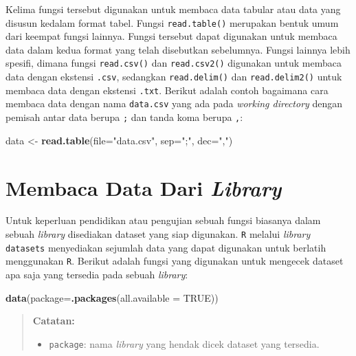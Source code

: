 \documentclass[
]{book}
\newenvironment{Shaded}{\begin{snugshade}}{\end{snugshade}}
\newcommand{\AttributeTok}[1]{\textcolor[rgb]{0.13,0.29,0.53}{#1}}
\newcommand{\ConstantTok}[1]{\textcolor[rgb]{0.56,0.35,0.01}{#1}}
\newcommand{\FunctionTok}[1]{\textcolor[rgb]{0.13,0.29,0.53}{\textbf{#1}}}
\newcommand{\NormalTok}[1]{#1}
\newcommand{\OtherTok}[1]{\textcolor[rgb]{0.56,0.35,0.01}{#1}}
\newcommand{\StringTok}[1]{\textcolor[rgb]{0.31,0.60,0.02}{#1}}
\providecommand{\tightlist}{%
  \setlength{\itemsep}{0pt}\setlength{\parskip}{0pt}}
\theoremstyle{definition}
\theoremstyle{definition}
\theoremstyle{definition}
\theoremstyle{definition}
\theoremstyle{remark}
\begin{document}
Kelima fungsi tersebut digunakan untuk membaca data tabular atau data yang disusun kedalam format tabel. Fungsi \texttt{read.table()} merupakan bentuk umum dari keempat fungsi lainnya. Fungsi tersebut dapat digunakan untuk membaca data dalam kedua format yang telah disebutkan sebelumnya. Fungsi lainnya lebih spesifi, dimana fungsi \texttt{read.csv()} dan \texttt{read.csv2()} digunakan untuk membaca data dengan ekstensi \texttt{.csv}, sedangkan \texttt{read.delim()} dan \texttt{read.delim2()} untuk membaca data dengan ekstensi \texttt{.txt}. Berikut adalah contoh bagaimana cara membaca data dengan nama \texttt{data.csv} yang ada pada \emph{working directory} dengan pemisah antar data berupa \texttt{;} dan tanda koma berupa \texttt{,}:

\begin{Shaded}
\begin{Highlighting}[]
\NormalTok{data }\OtherTok{\textless{}{-}} \FunctionTok{read.table}\NormalTok{(}\AttributeTok{file=}\StringTok{"data.csv"}\NormalTok{, }\AttributeTok{sep=}\StringTok{";"}\NormalTok{, }\AttributeTok{dec=}\StringTok{","}\NormalTok{)}
\end{Highlighting}
\end{Shaded}

\hypertarget{librarydata}{%
\section{\texorpdfstring{Membaca Data Dari \emph{Library}}{Membaca Data Dari Library}}\label{librarydata}}

Untuk keperluan pendidikan atau pengujian sebuah fungsi biasanya dalam sebuah \emph{library} disediakan dataset yang siap digunakan. \texttt{R} melalui \emph{library} \texttt{datasets} menyediakan sejumlah data yang dapat digunakan untuk berlatih menggunakan \texttt{R}. Berikut adalah fungsi yang digunakan untuk mengecek dataset apa saja yang tersedia pada sebuah \emph{library}:

\begin{Shaded}
\begin{Highlighting}[]
\FunctionTok{data}\NormalTok{(}\AttributeTok{package=}\FunctionTok{.packages}\NormalTok{(}\AttributeTok{all.available =} \ConstantTok{TRUE}\NormalTok{))}
\end{Highlighting}
\end{Shaded}

\begin{quote}
\textbf{Catatan:}

\begin{itemize}
\tightlist
\item
  \texttt{package}: nama \emph{library} yang hendak dicek dataset yang tersedia.
\end{itemize}
\end{quote}
\end{document}
